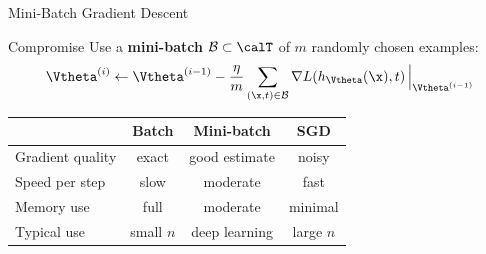 \begin{frame}{Mini-Batch Gradient Descent}
  \begin{block}{Compromise}
    Use a \textbf{mini-batch} $\mathcal{B} \subset \calT$ of $m$ randomly chosen examples:
    \[
      \Vtheta^{(i)} \leftarrow \Vtheta^{(i-1)}
      - \frac{\eta}{m}\sum_{(\x,t)\in\mathcal{B}}
        \nabla L\!\left(h_{\Vtheta}(\x), t\right)\Big|_{\Vtheta^{(i-1)}}
    \]
  \end{block}

  \vspace{.4em}
  \begin{center}
  \renewcommand{\arraystretch}{1.2}
  \begin{tabular}{lccc}
    \toprule
    & \textbf{Batch} & \textbf{Mini-batch} & \textbf{SGD} \\
    \midrule
    Gradient quality & exact & good estimate & noisy \\
    Speed per step   & slow  & moderate & fast \\
    Memory use       & full  & moderate & minimal \\
    Typical use      & small $n$ & deep learning & large $n$ \\
    \bottomrule
  \end{tabular}
  \end{center}
\end{frame}

